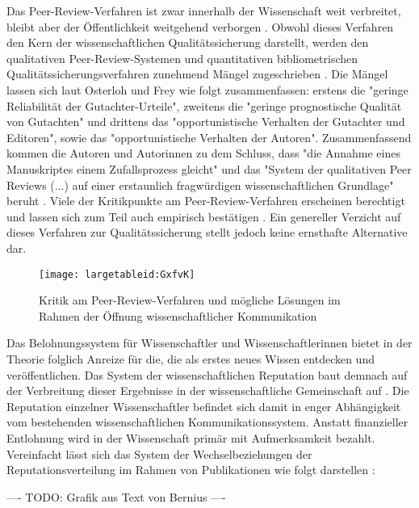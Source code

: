 Das Peer-Review-Verfahren ist zwar innerhalb der Wissenschaft weit verbreitet, bleibt aber der Öffentlichkeit weitgehend verborgen \cite{Konneker_2013}. Obwohl dieses Verfahren den Kern der wissenschaftlichen Qualitätssicherung darstellt, werden den qualitativen Peer-Review-Systemen und quantitativen bibliometrischen Qualitätssicherungsverfahren zunehmend Mängel zugeschrieben \cite{Peters_2014} \cite{Lee_2012} \cite{bar_2009_wissenschaftliche} \cite{osterloh2008anreize} \cite{ware_2008_peer} \cite{Jansen_2007} \cite{smith_1999_opening}. Die Mängel lassen sich laut Osterloh und Frey wie folgt zusammenfassen: erstens die "geringe Reliabilität der Gutachter-Urteile", zweitens die "geringe prognostische Qualität von Gutachten" und drittens das "opportunistische Verhalten der Gutachter und Editoren", sowie das "opportunistische Verhalten der Autoren". Zusammenfassend kommen die Autoren und Autorinnen zu dem Schluss, dass "die Annahme eines Manuskriptes einem Zufallsprozess gleicht" und das "System der qualitativen Peer Reviews (...) auf einer erstaunlich fragwürdigen wissenschaftlichen Grundlage" beruht \cite{osterloh2008anreize}. Viele der Kritikpunkte am Peer-Review-Verfahren erscheinen berechtigt und lassen sich zum Teil auch empirisch bestätigen \cite{mueller_2009_peerreview}. Ein genereller Verzicht auf dieses Verfahren zur Qualitätssicherung stellt jedoch keine ernsthafte Alternative dar.

\begin{figure}[h!]
\texttt{[image: largetableid:GxfvK]}
\caption{Kritik am Peer-Review-Verfahren und mögliche Lösungen im Rahmen der Öffnung wissenschaftlicher Kommunikation}
\end{figure}

Das Belohnungssystem für Wissenschaftler und Wissenschaftlerinnen bietet in der Theorie folglich Anreize für die, die als erstes neues Wissen entdecken und veröffentlichen. Das System der wissenschaftlichen Reputation baut demnach auf der Verbreitung dieser Ergebnisse in der wissenschaftliche Gemeinschaft auf \cite{Fabrizio_2008}. Die Reputation einzelner Wissenschaftler befindet sich damit in enger Abhängigkeit vom bestehenden wissenschaftlichen Kommunikationssystem. Anstatt finanzieller Entlohnung wird in der Wissenschaft primär mit Aufmerksamkeit bezahlt. Vereinfacht lässt sich das System der Wechselbeziehungen der Reputationsverteilung im Rahmen von Publikationen wie folgt darstellen \cite{cite:21a}:

---- TODO: Grafik aus Text von Bernius ----

